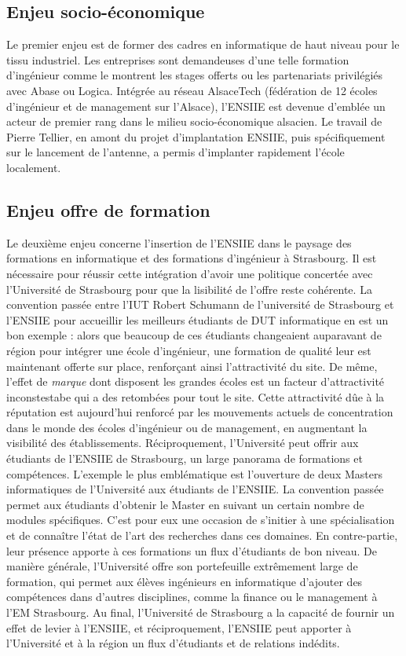 \documentclass[11pt]{article}
\begin{document}
\subsection*{Enjeu socio-économique}
Le premier enjeu est de former des cadres en informatique de haut niveau 
pour le tissu industriel. Les entreprises sont demandeuses d'une telle 
formation d'ingénieur comme le montrent les stages offerts
ou les partenariats privilégiés avec Abase ou Logica. Intégrée au réseau
AlsaceTech (fédération de 12 écoles d'ingénieur et de management sur
l'Alsace), l'ENSIIE est devenue d'emblée un acteur de premier rang
dans le milieu socio-économique alsacien. Le travail de Pierre Tellier,
en amont du projet d'implantation ENSIIE, puis spécifiquement sur le lancement
de l'antenne, a permis d'implanter rapidement l'école localement.

\subsection*{Enjeu offre de formation}
Le deuxième enjeu concerne l'insertion de l'ENSIIE dans le paysage
des formations en informatique et des formations d'ingénieur à Strasbourg.
Il est nécessaire pour réussir cette intégration d'avoir une politique 
concertée avec l'Université de Strasbourg pour que la lisibilité de 
l'offre reste cohérente. La convention passée entre l'IUT Robert Schumann de 
l'université de Strasbourg et l'ENSIIE pour accueillir les meilleurs 
étudiants de DUT informatique en est un bon exemple : alors que beaucoup 
de ces étudiants changeaient auparavant de région pour intégrer une école 
d'ingénieur, une formation de qualité leur est maintenant offerte sur place, 
renforçant ainsi l'attractivité du site. De même, l'effet de \emph{marque} 
dont disposent les grandes écoles est un facteur d'attractivité inconstestabe
qui a des retombées pour tout le site. Cette attractivité dûe à la réputation
est aujourd'hui renforcé par les mouvements actuels de concentration dans le
monde des écoles d'ingénieur ou de management, en augmentant la visibilité 
des établissements.
Réciproquement, l'Université peut offrir aux étudiants de l'ENSIIE de Strasbourg,
un large panorama de formations et compétences. L'exemple le plus emblématique
est l'ouverture de deux Masters informatiques de l'Université aux étudiants de 
l'ENSIIE. La convention passée permet aux étudiants d'obtenir le Master 
en suivant un certain nombre de modules spécifiques. C'est pour eux une occasion 
de s'initier à une spécialisation et de connaître l'état de l'art des recherches
dans ces domaines.
En contre-partie, leur présence apporte à ces formations un flux d'étudiants de 
bon niveau. De manière générale, l'Université offre son portefeuille extrêmement 
large de formation, qui permet aux élèves ingénieurs en informatique d'ajouter 
des compétences dans d'autres disciplines, comme la finance ou le management à 
l'EM Strasbourg. Au final, l'Université de Strasbourg a la capacité de fournir 
un effet de levier à l'ENSIIE, et réciproquement, l'ENSIIE peut apporter à 
l'Université et à la région un flux d'étudiants et de relations indédits.
\end{document}
